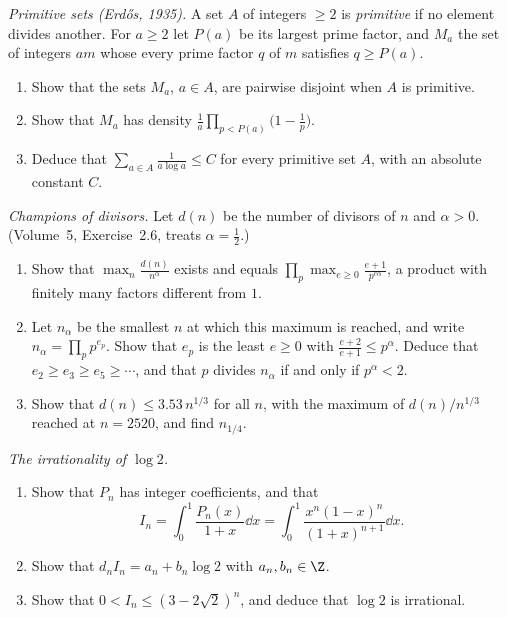 \begin{exercise}[$\star\star$]\label{pb:primitive}
\emph{Primitive sets (Erdős, 1935).} A set $A$ of integers $\ge2$ is \emph{primitive} if no element divides another. For $a\ge2$ let $P(a)$ be
its largest prime factor, and $M_a$ the set of integers $am$ whose every prime factor $q$ of $m$ satisfies $q\ge P(a)$.
\begin{enumerate}[label=(\alph*)]
\item Show that the sets $M_a$, $a\in A$, are pairwise disjoint when $A$ is primitive.
\item Show that $M_a$ has density $\frac1a\prod_{p<P(a)}\bigl(1-\frac1p\bigr)$.
\item Deduce that $\sum_{a\in A}\frac1{a\log a}\le C$ for every primitive set $A$, with an absolute constant $C$.
\end{enumerate}
\end{exercise}

\begin{exercise}[$\star\star$]\label{pb:divisorbound}
\emph{Champions of divisors.} Let $d(n)$ be the number of divisors of $n$ and $\alpha>0$. (Volume~5, Exercise~2.6, treats $\alpha=\frac12$.)
\begin{enumerate}[label=(\alph*)]
\item Show that $\max_n\frac{d(n)}{n^\alpha}$ exists and equals $\prod_p\max_{e\ge0}\frac{e+1}{p^{e\alpha}}$, a product with finitely many factors
different from $1$.
\item Let $n_\alpha$ be the smallest $n$ at which this maximum is reached, and write $n_\alpha=\prod_pp^{e_p}$. Show that $e_p$ is the least
$e\ge0$ with $\frac{e+2}{e+1}\le p^\alpha$. Deduce that $e_2\ge e_3\ge e_5\ge\cdots$, and that $p$ divides $n_\alpha$ if and only if $p^\alpha<2$.
\item Show that $d(n)\le3.53\,n^{1/3}$ for all $n$, with the maximum of $d(n)/n^{1/3}$ reached at $n=2520$, and find $n_{1/4}$.
\end{enumerate}
\end{exercise}

\begin{exercise}[$\star\star$]\label{pb:logtwo}
\emph{The irrationality of $\log2$.}
\begin{enumerate}[label=(\alph*)]
\item Show that $P_n$ has integer coefficients, and that
\[
I_n=\int_0^1\frac{P_n(x)}{1+x}\dd x=\int_0^1\frac{x^n(1-x)^n}{(1+x)^{n+1}}\dd x.
\]
\item Show that $d_nI_n=a_n+b_n\log2$ with $a_n,b_n\in\Z$.
\item Show that $0<I_n\le(3-2\sqrt2)^n$, and deduce that $\log2$ is irrational.
\end{enumerate}
\end{exercise}

